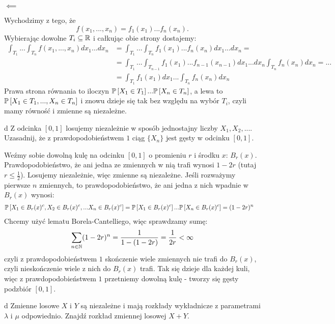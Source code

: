 \documentclass{article}
\begin{document}
$\impliedby$

Wychodzimy z tego, że
$$f(x_1,...,x_n)=f_1(x_1)...f_n(x_n).$$
Wybierając dowolne $T_i\subseteq\mathbb{R}$ i całkując obie strony dostajemy:
\begin{align*}
\int_{T_1}...\int_{T_n}f(x_1,...,x_n)dx_1...dx_n&=\int_{T_1}...\int_{T_n}f_1(x_1)...f_n(x_n)dx_1...dx_n=\\
&=\int_{T_1}...\int_{T_{n-1}}f_1(x_1)...f_{n-1}(x_{n-1})dx_1...dx_n\int_{T_n}f_n(x_n)dx_n=...\\
&=\int_{T_1}f_1(x_1)dx_1...\int_{T_n}f_n(x_n)dx_n
\end{align*}
Prawa strona równania to iloczyn $\prob{X_1\in T_1}...\prob{X_n\in T_n}$, a lewa to $\prob{X_1\in T_1,...,X_n\in T_n}$ i znowu dzieje się tak bez względu na wybór $T_i$, czyli mamy równość i zmienne są niezależne.

\begin{problem}[8]{d}
Z odcinka $[0,1]$ losujemy niezależnie w sposób jednostajny liczby $X_1,X_2,...$. Uzasadnij, że z prawdopodobieństwem $1$ ciąg $\{X_n\}$ jest gęsty w odcinku $[0,1]$.
\end{problem}

Weźmy sobie dowolną kulę na odcinku $[0,1]$ o promieniu $r$ i środku $x$: $B_r(x)$. Prawdopodobieństwo, że ani jedna ze zmiennych w nią trafi wynosi $1-2r$ (tutaj $r\leq\frac12$). Losujemy niezależnie, więc zmienne są niezależne. Jeśli rozważymy pierwsze $n$ zmiennych, to prawdopodobieństwo, że ani jedna z nich wpadnie w $B_r(x)$ wynosi:
\begin{align*}
    \prob{X_1\in B_r(x)^c,X_2\in B_r(x)^c,...X_n\in B_r(x)^c}&=\prob{X_1\in B_r(x)^c}...\prob{X_n\in B_r(x)^c}=(1-2r)^n
\end{align*}
Chcemy użyć lematu Borela-Cantelliego, więc sprawdzamy sumę:
\begin{align*}
    \sum_{n\in\mathbb{N}}(1-2r)^n=\frac{1}{1-(1-2r)}=\frac{1}{2r}<\infty
\end{align*}
czyli z prawdopodobieństwem $1$ skończenie wiele zmiennych nie trafi do $B_r(x)$, czyli nieskończenie wiele z nich do $B_r(x)$ trafi. Tak się dzieje dla każdej kuli, więc z prawdopodobieństwem $1$ przetniemy dowolną kulę - tworzy się gęsty podzbiór $[0,1]$.

\begin{problem}[9]{d}
Zmienne losowe $X$ i $Y$ są niezależne i mają rozkłady wykładnicze z parametrami $\lambda$ i $\mu$ odpowiednio. Znajdź rozkład zmiennej losowej $X+Y$.
\end{problem}
\end{document}
